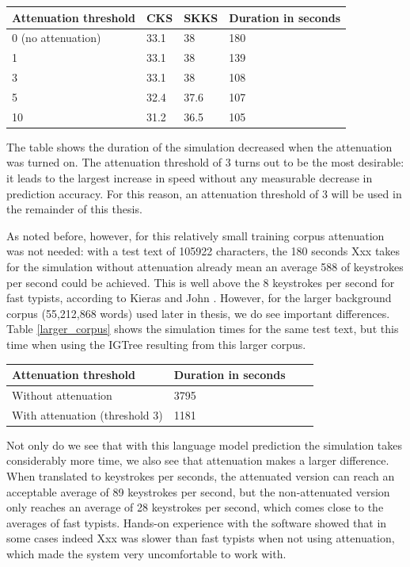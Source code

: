 \documentclass[11pt]{article}
\let\originaltable\table
\let\endoriginaltable\endtable
\renewenvironment{table}[1][ht]{%
  \originaltable[#1]
  \centering}%
  {\endoriginaltable}
\begin{document}
\begin{table}[h]
\begin{tabular}{l|lll} 

Attenuation threshold&CKS&SKKS&Duration in seconds\\
\hline
0 (no attenuation)&33.1&38&180\\
1&33.1&38&139\\
3&33.1&38&108\\
5&32.4&37.6&107\\
10&31.2&36.5&105\\
\end{tabular} 
\caption{Percentage of keystrokes saved and simulation times with 4 attenuation thresholds.} \label{results_att}
\end{table}

The table shows the duration of the simulation decreased when the attenuation was turned on. The attenuation threshold of 3 turns out to be the most desirable: it leads to the largest increase in speed without any measurable decrease in prediction accuracy. For this reason, an attenuation threshold of 3 will be used in the remainder of this thesis.

As noted before, however, for this relatively small training corpus attenuation was not needed: with a test text of 105922 characters, the 180 seconds Xxx takes for the simulation without attenuation already mean an average 588 of keystrokes per second could be achieved. This is well above the 8 keystrokes per second for fast typists, according to Kieras and John . However, for the larger background corpus (55,212,868 words) used later in thesis, we do see important differences. Table \ref{larger_corpus} shows the simulation times for the same test text, but this time when using the IGTree resulting from this larger corpus.

\begin{table}[h]
\begin{tabular}{l|lll} 

Attenuation threshold&Duration in seconds\\
\hline
Without attenuation&3795\\
With attenuation (threshold 3)&1181\\
\end{tabular} 
\caption{Simulation times when using a larger corpus.} \label{larger_corpus}
\end{table}

Not only do we see that with this language model prediction the simulation takes considerably more time, we also see that attenuation makes a larger difference. When translated to keystrokes per seconds, the attenuated version can reach an acceptable average of 89 keystrokes per second, but the non-attenuated version only reaches an average of 28 keystrokes per second, which comes close to the averages of fast typists. Hands-on experience with the software showed that in some cases indeed Xxx was slower than fast typists when not using attenuation, which made the system very uncomfortable to work with.
\end{document}
